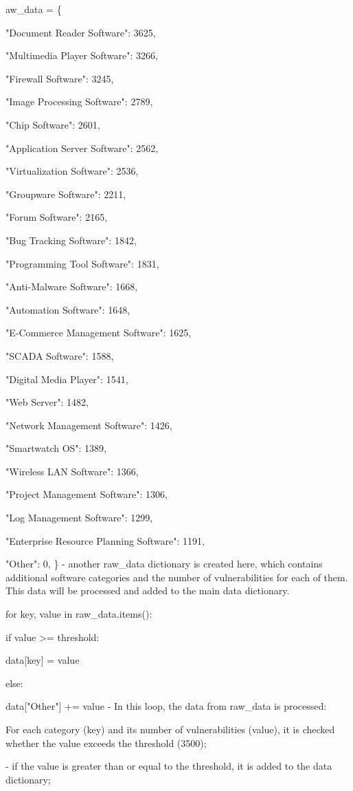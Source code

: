 aw\_data = \{

"Document Reader Software": 3625,

"Multimedia Player Software": 3266,

"Firewall Software": 3245,

"Image Processing Software": 2789,

"Chip Software": 2601,

"Application Server Software": 2562,

"Virtualization Software": 2536,

"Groupware Software": 2211,

"Forum Software": 2165,

"Bug Tracking Software": 1842,

"Programming Tool Software": 1831,

"Anti-Malware Software": 1668,

"Automation Software": 1648,

"E-Commerce Management Software": 1625,

"SCADA Software": 1588,

"Digital Media Player": 1541,

"Web Server": 1482,

"Network Management Software": 1426,

"Smartwatch OS": 1389,

"Wireless LAN Software": 1366,

"Project Management Software": 1306,

"Log Management Software": 1299,

"Enterprise Resource Planning Software": 1191,

"Other": 0, \} - another raw\_data dictionary is created here, which
contains additional software categories and the number of
vulnerabilities for each of them. This data will be processed and added
to the main data dictionary.

for key, value in raw\_data.items():

if value \textgreater= threshold:

data{[}key{]} = value

else:

data{[}"Other"{]} += value - In this loop, the data from raw\_data is
processed:

For each category (key) and its number of vulnerabilities (value), it is
checked whether the value exceeds the threshold (3500);

- if the value is greater than or equal to the threshold, it is added to
the data dictionary;

